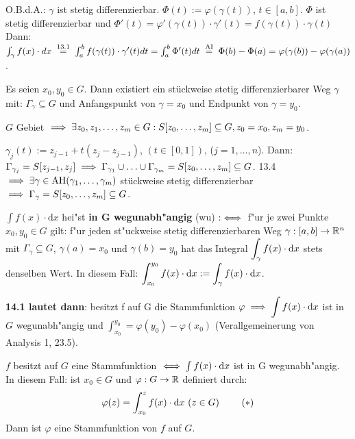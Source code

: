 \documentclass[a4paper,twoside,DIV15,BCOR12mm,chapterprefix=true,headings=twolinechapter]{scrbook}
\begin{document}
\begin{beweis}
O.B.d.A.: $\gamma$ ist stetig differenzierbar. $\Phi(t):= \varphi (\gamma(t))$, $t\in[a,b]$. $\Phi$ ist stetig differenzierbar und $\Phi'(t) = \varphi'(\gamma(t))\cdot \gamma'(t) = f(\gamma(t))\cdot\gamma(t)$ Dann: $\int_\gamma f(x)\cdot dx \gleichnach{13.1} \int_a^bf(\gamma(t))\cdot\gamma'(t)dt = \int_a^b\Phi'(t)dt \gleichnach{AI} \Phi(b)-\Phi(a) = \varphi(\gamma(b))-\varphi(\gamma(a))$.
\end{beweis}

\begin{wichtigerhilfssatz}
Es seien $x_0,y_0\in G$. Dann existiert ein stückweise stetig differenzierbarer Weg $\gamma$ mit: $\Gamma_\gamma\subseteq G$ und Anfangspunkt von $\gamma = x_0$ und Endpunkt von $\gamma=y_0$.
\end{wichtigerhilfssatz}

\begin{beweis}
$G$ Gebiet $\implies \exists z_0,z_1,\ldots,z_m \in G: S[z_0,\ldots,z_m]\subseteq G, z_0=x_0, z_m = y_0$.

$\gamma_j(t) := z_{j-1} + t(z_j - z_{j-1})$, $(t\in[0,1])$, ($j=1,\ldots,n$). Dann:$\Gamma_{\gamma_j} = S[z_{j-1},z_{j}] \implies \Gamma_{\gamma_1}\cup\ldots\cup\Gamma_{\gamma_m} = S[z_0,\ldots,z_m] \subseteq G$. 13.4 $\implies \exists \gamma \in \text{AH}(\gamma_1,\ldots,\gamma_m)$ stückweise stetig differenzierbar $\implies \Gamma_{\gamma} = S[z_0,\ldots,z_m] \subseteq G$. 
\end{beweis}

\begin{definition*}
$\int f(x)\cdot \text{d}x$ hei"st \textbf{in G wegunabh"angig} (wu) $:\iff$ f"ur je zwei Punkte $x_0, y_0\in G$ gilt: f"ur jeden st"uckweise stetig differenzierbaren Weg $\gamma:[a,b]\to\mathbb{R}^n$ mit $\Gamma_\gamma\subseteq G$, $\gamma(a)=x_0$ und $\gamma(b)=y_0$ hat das Integral $\displaystyle\int_\gamma f(x)\cdot\text{d}x$ stets denselben Wert. In diesem Fall: $\displaystyle\int_{x_0}^{y_0}f(x)\cdot\text{d}x:=\displaystyle\int_\gamma f(x)\cdot\text{d}x$.
\end{definition*}

\textbf{14.1 lautet dann}: besitzt f auf G die Stammfunktion $\varphi\implies \displaystyle\int f(x)\cdot\text{d}x$ ist in $G$ wegunabh"angig und $\int_{x_0}^{y_0}=\varphi(y_0)-\varphi(x_0)$ (Verallgemeinerung von Analysis 1, 23.5).

\begin{satz}
$f$ besitzt auf $G$ eine Stammfunktion $\iff\int f(x)\cdot\text{d}x$ ist in G wegunabh"angig. \\
In diesem Fall: ist $x_0\in G$ und $\varphi:G\to\mathbb{R}$ definiert durch: 
\begin{align*}
\varphi(z)=\displaystyle\int_{x_0}^z f(x)\cdot\text{d}x\ (z\in G)\ \tag{$*$}
\end{align*}
Dann ist $\varphi$ eine Stammfunktion von $f$ auf $G$.
\end{satz}
\end{document}
